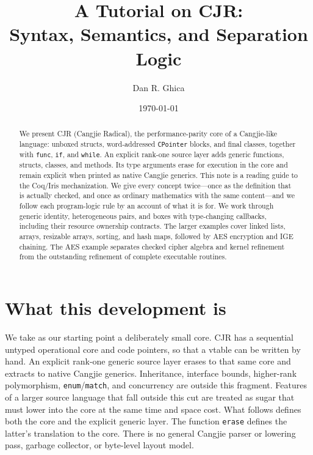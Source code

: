 \documentclass[11pt]{article}
\title{A Tutorial on CJR:\\
Syntax, Semantics, and Separation Logic}
\author{Dan R. Ghica}
\date{\today}
\newcommand{\cjr}{CJR}
\begin{document}
\maketitle

\begin{abstract}
We present \cjr{} (Cangjie Radical), the performance-parity core of a Cangjie-like language: unboxed structs, word-addressed \texttt{CPointer} blocks, and final classes, together with \texttt{func}, \texttt{if}, and \texttt{while}.
An explicit rank-one source layer adds generic functions, structs, classes,
and methods. Its type arguments erase for execution in the core and remain
explicit when printed as native Cangjie generics.
This note is a reading guide to the Coq/Iris mechanization.
We give every concept twice---once as the definition that is actually checked, and once as ordinary mathematics with the same content---and we follow each program-logic rule by an account of what it is for.
We work through generic identity, heterogeneous pairs, and boxes with
type-changing callbacks, including their resource ownership contracts.
The larger examples cover linked lists, arrays, resizable arrays, sorting,
and hash maps, followed by AES encryption and IGE chaining. The AES example separates checked cipher algebra and kernel refinement from the outstanding refinement of complete executable routines.
\end{abstract}

\clearpage
\tableofcontents
\clearpage

\section{What this development is}

We take as our starting point a deliberately small core.
\cjr{} has a sequential untyped operational core and code pointers, so that a vtable can be written by hand.
An explicit rank-one generic source layer erases to that same core and extracts to native Cangjie generics.
Inheritance, interface bounds, higher-rank polymorphism, \texttt{enum}/\texttt{match}, and concurrency are outside this fragment.
Features of a larger source language that fall outside this cut are treated as sugar that must lower into the core at the same time and space cost.
What follows defines both the core and the explicit generic layer.
The function \texttt{erase} defines the latter's translation to the core.
There is no general Cangjie parser or lowering pass, garbage collector,
or byte-level layout model.
\end{document}
